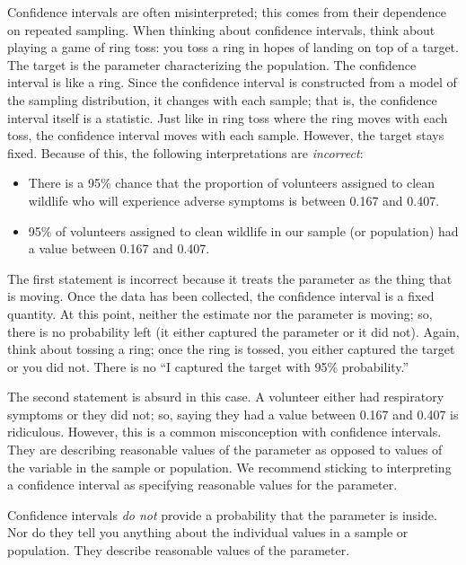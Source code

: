 \documentclass[
]{book}
\providecommand{\tightlist}{%
  \setlength{\itemsep}{0pt}\setlength{\parskip}{0pt}}
\theoremstyle{plain}
\theoremstyle{mydefn}
\theoremstyle{myexmpl}
\theoremstyle{remark}
\begin{document}
Confidence intervals are often misinterpreted; this comes from their dependence on repeated sampling. When thinking about confidence intervals, think about playing a game of ring toss: you toss a ring in hopes of landing on top of a target. The target is the parameter characterizing the population. The confidence interval is like a ring. Since the confidence interval is constructed from a model of the sampling distribution, it changes with each sample; that is, the confidence interval itself is a statistic. Just like in ring toss where the ring moves with each toss, the confidence interval moves with each sample. However, the target stays fixed. Because of this, the following interpretations are \emph{incorrect}:

\begin{itemize}
\tightlist
\item
  There is a 95\% chance that the proportion of volunteers assigned to clean wildlife who will experience adverse symptoms is between 0.167 and 0.407.
\item
  95\% of volunteers assigned to clean wildlife in our sample (or population) had a value between 0.167 and 0.407.
\end{itemize}

The first statement is incorrect because it treats the parameter as the thing that is moving. Once the data has been collected, the confidence interval is a fixed quantity. At this point, neither the estimate nor the parameter is moving; so, there is no probability left (it either captured the parameter or it did not). Again, think about tossing a ring; once the ring is tossed, you either captured the target or you did not. There is no ``I captured the target with 95\% probability.''

The second statement is absurd in this case. A volunteer either had respiratory symptoms or they did not; so, saying they had a value between 0.167 and 0.407 is ridiculous. However, this is a common misconception with confidence intervals. They are describing reasonable values of the parameter as opposed to values of the variable in the sample or population. We recommend sticking to interpreting a confidence interval as specifying reasonable values for the parameter.

\begin{rmdtip}
Confidence intervals \emph{do not} provide a probability that the parameter is inside. Nor do they tell you anything about the individual values in a sample or population. They describe reasonable values of the parameter.
\end{rmdtip}
\end{document}
